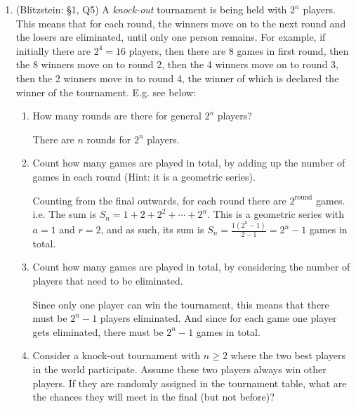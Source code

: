 \documentclass[11pt]{article}
\begin{document}
\begin{enumerate}
	\item (Blitzstein: \S 1, Q5) A \emph{knock-out} tournament is being held with $ 2^n $ players. This means that for each round, the winners move on to the next round and the losers are eliminated, until only one person remains. For example, if initially there are $ 2^4 = 16 $ players, then there are 8 games in first round, then the 8 winners move on to round 2, then the 4 winners move on to round 3, then the 2 winners move in to round 4, the winner of which is declared the winner of the tournament. E.g. see below:
		\begin{enumerate}
			\item How many rounds are there for general $ 2^n $ players?
				\begin{mdframed}
					There are $ n $ rounds for $ 2^n $ players.
				\end{mdframed}
			\item Count how many games are played in total, by adding up the number of games in each round (Hint: it is a geometric series).
				\begin{mdframed}
					Counting from the final outwards, for each round there are $ 2^{\text{round}} $ games.\\
					i.e. The sum is $ S_n = 1 + 2 + 2^2 + \cdots + 2^n $. This is a geometric series with $ a = 1 $ and $ r = 2 $, and as such, its sum is $ S_n = \frac{1\left( 2^n - 1 \right)}{2 -1} = 2^n - 1$ games in total.
				\end{mdframed}
			\item Count how many games are played in total, by considering the number of players that need to be eliminated.
				\begin{mdframed}
					Since only one player can win the tournament, this means that there must be $ 2^n - 1 $ players eliminated. And since for each game one player gets eliminated, there must be $ 2^n - 1 $ games in total.
				\end{mdframed}
			\item Consider a knock-out tournament with $ n \geq 2 $ where the two best players in the world participate. Assume these two players always win other players. If they are randomly assigned in the tournament table, what are the chances they will meet in the final (but not before)?
		\end{enumerate}
\end{enumerate}
\end{document}
